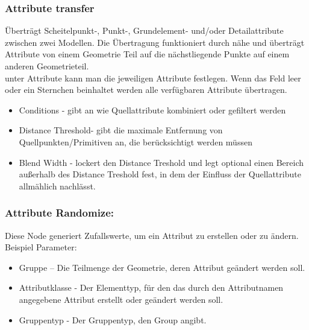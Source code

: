 \documentclass[paper=a4,fontsize=12pt,ngerman]{scrartcl}
\begin{document}
 	\subsubsection*{Attribute transfer}
 	Überträgt Scheitelpunkt-, Punkt-, Grundelement- und/oder Detailattribute zwischen zwei Modellen.
 	Die Übertragung funktioniert durch nähe und überträgt Attribute von einem Geometrie Teil auf die nächstliegende Punkte auf einem anderen Geometrieteil. \\
 	unter Attribute kann man die jeweiligen Attribute festlegen. Wenn das Feld leer oder ein Sternchen beinhaltet werden alle verfügbaren Attribute übertragen.
 	\begin{itemize}
 		\item Conditions - gibt an wie Quellattribute kombiniert oder gefiltert werden
 		\item Distance Threshold- gibt die maximale Entfernung von Quellpunkten/Primitiven an, die berücksichtigt werden müssen
 		\item Blend Width - lockert den Distance Treshold und legt optional einen Bereich außerhalb des Distance Treshold fest, in dem der Einfluss der Quellattribute allmählich nachlässt.
 	\end{itemize}
 	
 		\subsubsection*{Attribute Randomize:}
 	Diese Node generiert Zufallswerte, um ein Attribut zu erstellen oder zu ändern. Beispiel Parameter: 
 	\begin{itemize}
 		\item Gruppe – Die Teilmenge der Geometrie, deren Attribut geändert werden soll.
 		\item Attributklasse - Der Elementtyp, für den das durch den Attributnamen angegebene Attribut erstellt oder geändert werden soll.
 		\item Gruppentyp - Der Gruppentyp, den Group angibt.
 	\end{itemize}
 	
\end{document}
